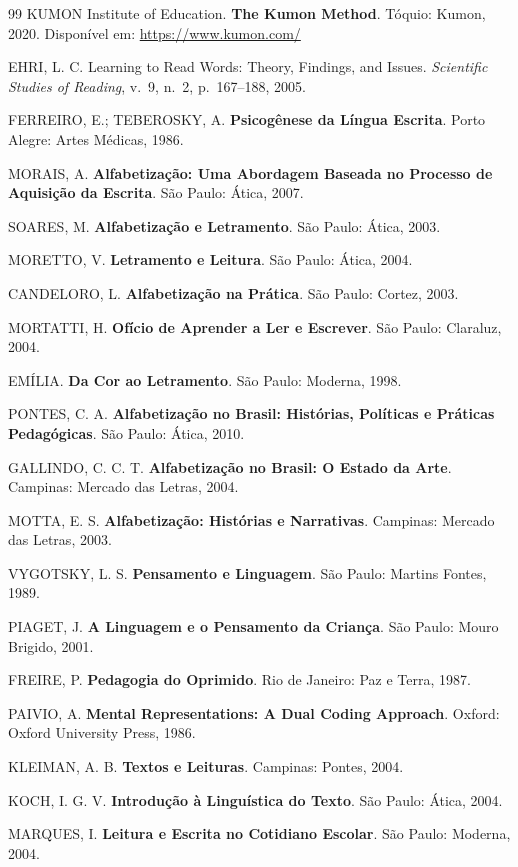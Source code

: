 \begin{thebibliography}{99}
KUMON Institute of Education. \textbf{The Kumon Method}.
Tóquio: Kumon, 2020. Disponível em: \url{https://www.kumon.com/}

EHRI, L. C. Learning to Read Words: Theory, Findings, and Issues.
\textit{Scientific Studies of Reading}, v.~9, n.~2, p.~167--188, 2005.

FERREIRO, E.; TEBEROSKY, A. \textbf{Psicogênese da Língua Escrita}.
Porto Alegre: Artes Médicas, 1986.

MORAIS, A. \textbf{Alfabetização: Uma Abordagem Baseada no Processo
de Aquisição da Escrita}. São Paulo: Ática, 2007.

SOARES, M. \textbf{Alfabetização e Letramento}. São Paulo: Ática, 2003.

MORETTO, V. \textbf{Letramento e Leitura}. São Paulo: Ática, 2004.

CANDELORO, L. \textbf{Alfabetização na Prática}. São Paulo: Cortez, 2003.

MORTATTI, H. \textbf{Ofício de Aprender a Ler e Escrever}.
São Paulo: Claraluz, 2004.

EMÍLIA. \textbf{Da Cor ao Letramento}. São Paulo: Moderna, 1998.

PONTES, C. A. \textbf{Alfabetização no Brasil: Histórias, Políticas
e Práticas Pedagógicas}. São Paulo: Ática, 2010.

GALLINDO, C. C. T. \textbf{Alfabetização no Brasil: O Estado da Arte}.
Campinas: Mercado das Letras, 2004.

MOTTA, E. S. \textbf{Alfabetização: Histórias e Narrativas}.
Campinas: Mercado das Letras, 2003.


VYGOTSKY, L. S. \textbf{Pensamento e Linguagem}. São Paulo: Martins
Fontes, 1989.

PIAGET, J. \textbf{A Linguagem e o Pensamento da Criança}.
São Paulo: Mouro Brigido, 2001.

FREIRE, P. \textbf{Pedagogia do Oprimido}. Rio de Janeiro: Paz e Terra,
1987.

PAIVIO, A. \textbf{Mental Representations: A Dual Coding Approach}.
Oxford: Oxford University Press, 1986.

KLEIMAN, A. B. \textbf{Textos e Leituras}. Campinas: Pontes, 2004.

KOCH, I. G. V. \textbf{Introdução à Linguística do Texto}.
São Paulo: Ática, 2004.

MARQUES, I. \textbf{Leitura e Escrita no Cotidiano Escolar}.
São Paulo: Moderna, 2004.

\end{thebibliography}

